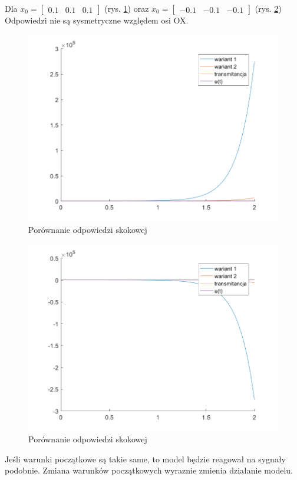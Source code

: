 \documentclass{article}
\begin{document}
Dla $x_0 = \begin{bmatrix}
0.1 & 0.1 & 0.1
\end{bmatrix}$ (rys. \ref{fig:z3c}) oraz $x_0 = \begin{bmatrix}
-0.1 & -0.1 & -0.1
\end{bmatrix}$ (rys. \ref{fig:z3b})
Odpowiedzi nie są sysmetryczne względem osi OX.\\
\begin{figure}[H]
\centering
\includegraphics[width=0.9\linewidth]{z3c}
\caption{Porównanie odpowiedzi skokowej}
\label{fig:z3c}
\end{figure}
\begin{figure}[H]
\centering
\includegraphics[width=0.9\linewidth]{z3b}
\caption{Porównanie odpowiedzi skokowej}
\label{fig:z3b}
\end{figure}
Jeśli warunki początkowe są takie same, to model będzie reagował na sygnały podobnie. Zmiana warunków początkowych wyraznie zmienia działanie modelu.
\end{document}
